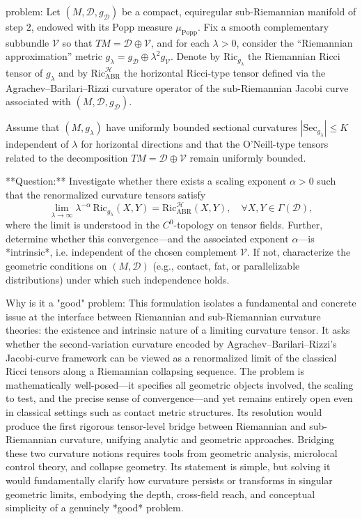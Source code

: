 problem:  
Let \((M,\mathcal{D},g_{\mathcal{D}})\) be a compact, equiregular sub-Riemannian manifold of step \(2\), endowed with its Popp measure \(\mu_{\mathrm{Popp}}\).  
Fix a smooth complementary subbundle \(\mathcal{V}\) so that \(TM=\mathcal{D}\oplus\mathcal{V}\), and for each \(\lambda>0\), consider the “Riemannian approximation” metric \(g_\lambda = g_{\mathcal{D}} \oplus \lambda^2 g_{\mathcal{V}}\).  
Denote by \(\mathrm{Ric}_{g_\lambda}\) the Riemannian Ricci tensor of \(g_\lambda\) and by \(\mathrm{Ric}^{\mathcal{H}}_{\mathrm{ABR}}\) the horizontal Ricci-type tensor defined via the Agrachev–Barilari–Rizzi curvature operator of the sub-Riemannian Jacobi curve associated with \((M,\mathcal{D},g_\mathcal{D})\).  

Assume that \((M,g_\lambda)\) have uniformly bounded sectional curvatures \(|\mathrm{Sec}_{g_\lambda}| \le K\) independent of \(\lambda\) for horizontal directions and that the O’Neill-type tensors related to the decomposition \(TM=\mathcal{D}\oplus\mathcal{V}\) remain uniformly bounded.  

**Question:**  
Investigate whether there exists a scaling exponent \(\alpha>0\) such that the renormalized curvature tensors satisfy  
\[
\lim_{\lambda\to\infty} \lambda^{-\alpha}\, \mathrm{Ric}_{g_\lambda}(X,Y) = \mathrm{Ric}^{\mathcal{H}}_{\mathrm{ABR}}(X,Y),
\quad \forall X,Y\in\Gamma(\mathcal{D}),
\]
where the limit is understood in the \(C^0\)-topology on tensor fields.  
Further, determine whether this convergence—and the associated exponent \(\alpha\)—is *intrinsic*, i.e. independent of the chosen complement \(\mathcal{V}\). If not, characterize the geometric conditions on \((M,\mathcal{D})\) (e.g., contact, fat, or parallelizable distributions) under which such independence holds.  

Why is it a "good" problem:  
This formulation isolates a fundamental and concrete issue at the interface between Riemannian and sub-Riemannian curvature theories: the existence and intrinsic nature of a limiting curvature tensor. It asks whether the second-variation curvature encoded by Agrachev–Barilari–Rizzi’s Jacobi-curve framework can be viewed as a renormalized limit of the classical Ricci tensors along a Riemannian collapsing sequence.  
The problem is mathematically well-posed—it specifies all geometric objects involved, the scaling to test, and the precise sense of convergence—and yet remains entirely open even in classical settings such as contact metric structures.  
Its resolution would produce the first rigorous tensor-level bridge between Riemannian and sub-Riemannian curvature, unifying analytic and geometric approaches. Bridging these two curvature notions requires tools from geometric analysis, microlocal control theory, and collapse geometry. Its statement is simple, but solving it would fundamentally clarify how curvature persists or transforms in singular geometric limits, embodying the depth, cross-field reach, and conceptual simplicity of a genuinely *good* problem.